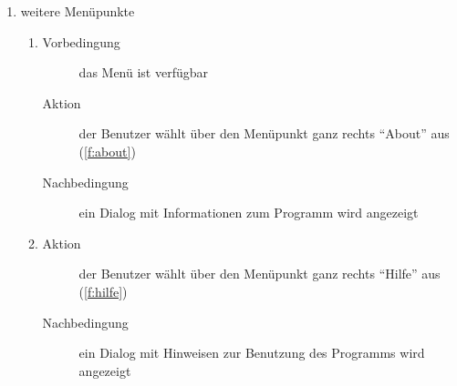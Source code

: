 \begin{enumerate} [label=\bfseries /TS \arabic*0/, leftmargin=*]
	\item weitere Menüpunkte
	\begin{enumerate}
		\item
		\begin{description}
			\item[Vorbedingung] das Menü ist verfügbar
			\item[Aktion] der Benutzer wählt über den Menüpunkt ganz rechts \enquote{About} aus (\ref{f:about})
			\item[Nachbedingung] ein \gls{Dialog} mit Informationen zum Programm wird angezeigt
		\end{description}
		\item
		\begin{description}
			\item[Aktion] der Benutzer wählt über den Menüpunkt ganz rechts \enquote{Hilfe} aus (\ref{f:hilfe})
			\item[Nachbedingung] ein \gls{Dialog} mit Hinweisen zur Benutzung des Programms wird angezeigt
		\end{description}
	\end{enumerate}
\end{enumerate}

